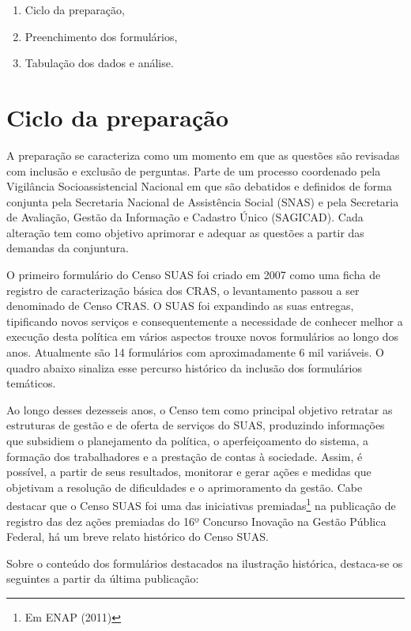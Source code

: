 \documentclass[
  brazilian]{report}
\providecommand{\tightlist}{%
  \setlength{\itemsep}{0pt}\setlength{\parskip}{0pt}}
\begin{document}
\begin{enumerate}
\def\labelenumi{\alph{enumi})}
\tightlist
\item
  Ciclo da preparação,
\item
  Preenchimento dos formulários,
\item
  Tabulação dos dados e análise.
\end{enumerate}

\hypertarget{ciclo-da-preparauxe7uxe3o}{%
\section{Ciclo da preparação}\label{ciclo-da-preparauxe7uxe3o}}

A preparação se caracteriza como um momento em que as questões são
revisadas com inclusão e exclusão de perguntas. Parte de um processo
coordenado pela Vigilância Socioassistencial Nacional em que são
debatidos e definidos de forma conjunta pela Secretaria Nacional de
Assistência Social (SNAS) e pela Secretaria de Avaliação, Gestão da
Informação e Cadastro Único (SAGICAD). Cada alteração tem como objetivo
aprimorar e adequar as questões a partir das demandas da conjuntura.

O primeiro formulário do Censo SUAS foi criado em 2007 como uma ficha de
registro de caracterização básica dos CRAS, o levantamento passou a ser
denominado de Censo CRAS. O SUAS foi expandindo as suas entregas,
tipificando novos serviços e consequentemente a necessidade de conhecer
melhor a execução desta política em vários aspectos trouxe novos
formulários ao longo dos anos. Atualmente são 14 formulários com
aproximadamente 6 mil variáveis. O quadro abaixo sinaliza esse percurso
histórico da inclusão dos formulários temáticos.

Ao longo desses dezesseis anos, o Censo tem como principal objetivo
retratar as estruturas de gestão e de oferta de serviços do SUAS,
produzindo informações que subsidiem o planejamento da política, o
aperfeiçoamento do sistema, a formação dos trabalhadores e a prestação
de contas à sociedade. Assim, é possível, a partir de seus resultados,
monitorar e gerar ações e medidas que objetivam a resolução de
dificuldades e o aprimoramento da gestão. Cabe destacar que o Censo SUAS
foi uma das iniciativas premiadas\footnote{Em ENAP (2011)} na publicação
de registro das dez ações premiadas do 16º Concurso Inovação na Gestão
Pública Federal, há um breve relato histórico do Censo SUAS.

Sobre o conteúdo dos formulários destacados na ilustração histórica,
destaca-se os seguintes a partir da última publicação:
\end{document}
